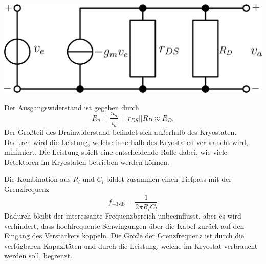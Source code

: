 \begin{minipage}[!b]{\textwidth}
\begin{minipage}[c]{0.6\textwidth}
\begin{minipage}[c]{0.5\textwidth}
\includegraphics[width=2\textwidth]{./fig/AmpEq.pdf}
\end{minipage}
\end{minipage}
\vspace{5mm}
\label{fig:Amp}
\end{minipage}

Der Ausgangswiderstand ist gegeben durch
\begin{equation}
R_a = \frac{u_a}{i_a} = r_{DS}||R_D \approx R_D.
\end{equation}
Der Großteil des Drainwiderstand befindet sich außerhalb des Kryostaten.
Dadurch wird die Leistung, welche innerhalb des Kryostaten verbraucht wird, minimiert.
Die Leistung spielt eine entscheidende Rolle dabei, wie viele Detektoren im Kryostaten betrieben werden können.

Die Kombination aus $R_l$ und $C_l$ bildet zusammen einen Tiefpass mit der Grenzfrequenz
\begin{equation}
f_{-3\,\mathrm{db}} = \frac{1}{2\pi R_l C_l}
\end{equation}
Dadurch bleibt der interessante Frequenzbereich unbeeinflusst, aber es wird verhindert, dass hochfrequente Schwingungen über die Kabel zurück auf den Eingang des Verstärkers koppeln.
Die Größe der Grenzfrequenz ist durch die verfügbaren Kapazitäten und durch die Leistung, welche im Kryostat verbraucht werden soll, begrenzt.

